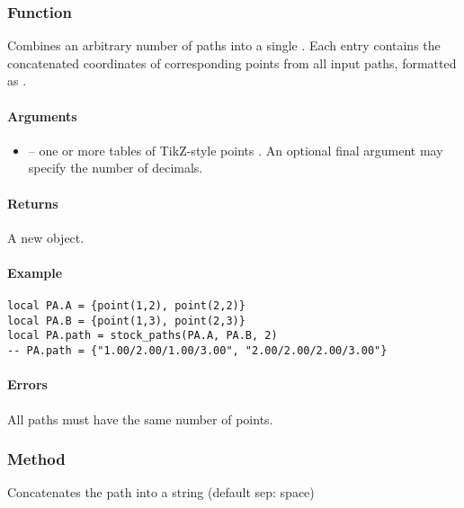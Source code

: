 \subsubsection{Function }
\label{ssub:method_tkzmeth_path_stock__paths}

Combines an arbitrary number of paths into a single . Each entry contains the concatenated coordinates of corresponding points from all input paths, formatted as .

\paragraph{Arguments}
\begin{itemize}
  \item {} – one or more tables of TikZ-style points . An optional final argument may specify the number of decimals.
\end{itemize}

\paragraph{Returns} A new  object.

\paragraph{Example}
\begin{verbatim}
local PA.A = {point(1,2), point(2,2)}
local PA.B = {point(1,3), point(2,3)}
local PA.path = stock_paths(PA.A, PA.B, 2)
-- PA.path = {"1.00/2.00/1.00/3.00", "2.00/2.00/2.00/3.00"}
\end{verbatim}

\paragraph{Errors} All paths must have the same number of points.

\subsubsection{Method }
\label{ssub:method_tkzmeth_path_concat}

Concatenates the path into a string (default sep: space)

\begin{tkzexample}[latex=.3\textwidth]
\end{tkzexample}


